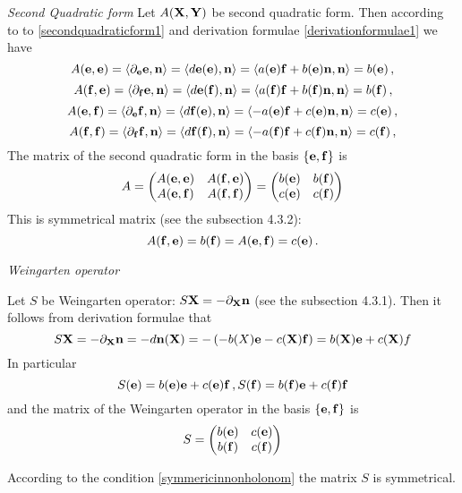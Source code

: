 \documentclass[12pt]{article}
\theoremstyle{theorem}
\numberwithin{equation}{section}
\begin{document}
{\m
{\it Second Quadratic form}
  Let $A({\bf X},{\bf Y})$ be second quadratic form. Then according to
  to \eqref{secondquadraticform1} and derivation formulae \eqref{derivationformulae1} we have
               $$
  A({\bf e},{\bf e})=\langle\partial_{\bf e}{\bf e},{\bf n}\rangle=\langle d{\bf e}({\bf e}),{\bf n}\rangle=\langle a({\bf e}){\bf f}+b({\bf e}){\bf n},{\bf n}\rangle=b({\bf e})\,,
               $$
         $$
   A({\bf f},{\bf e})=\langle\partial_{\bf f}{\bf e},{\bf n}\rangle=\langle d{\bf e}({\bf f}),{\bf n}\rangle=\langle a({\bf f}){\bf f}+b({\bf f}){\bf n},{\bf n}\rangle=b({\bf f})\,,
         $$
         $$
     A({\bf e},{\bf f})=\langle\partial_{\bf e}{\bf f},{\bf n}\rangle=\langle d{\bf f}({\bf e}),{\bf n}\rangle=\langle -a({\bf e}){\bf f}+c({\bf e}){\bf n},{\bf n}\rangle=c({\bf e})\,,
           $$
           $$
           A({\bf f},{\bf f})=\langle\partial_{\bf f}{\bf f},{\bf n}\rangle=\langle d{\bf f}({\bf f}),{\bf n}\rangle=\langle -a({\bf f}){\bf f}+c({\bf f}){\bf n},{\bf n}\rangle=c({\bf f})\,,
           $$
     The matrix of the second quadratic form in the basis $\{{\bf e},{\bf f}\}$ is
     \begin{equation}\label{inducedquadrforminnonholonombasis}
        A=
        \begin{pmatrix}
        A({\bf e},{\bf e})& A({\bf f},{\bf e})\cr
        A({\bf e},{\bf f})& A({\bf f},{\bf f})\cr
        \end{pmatrix}
        =
        \begin{pmatrix}
        b({\bf e})&  b({\bf f})\cr
        c({\bf e})& c({\bf f})\cr
        \end{pmatrix}
     \end{equation}
 This is symmetrical matrix (see the subsection 4.3.2):
            \begin{equation}\label{symmericinnonholonom}
 A({\bf f},{\bf e})=b({\bf f})=A({\bf e},{\bf f})=c({\bf e})\,.
            \end{equation}

\m
{\it Weingarten operator}

Let $S$ be Weingarten operator: $S{\bf X}=-\partial_{\bf X}{\bf n}$ (see the subsection 4.3.1). Then
it follows from derivation formulae that
                  $$
     S{\bf X}=-\partial_{\bf X}{\bf n}=-d{\bf n}({\bf X})=-\left(-b(X){\bf e}-c({\bf X}){\bf f}\right)=b({\bf X}){\bf e}+c({\bf X})f
                  $$
In particular
 \begin{equation*}\label{inducedweingartenoperator}
    S({\bf e})=b({\bf e}){\bf e}+c({\bf e}){\bf f}\,, S({\bf f})=b({\bf f}){\bf e}+c({\bf f}){\bf f}
\end{equation*}
and the matrix of the Weingarten operator in the basis $\{{\bf e},{\bf f}\}$ is
\begin{equation}\label{inducedweingartenoperator}
S=
\begin{pmatrix}
b({\bf e})  &c({\bf e})\cr
b({\bf f})  &c({\bf f})\cr
\end{pmatrix}
\end{equation}

According to the condition \eqref{symmericinnonholonom}  the matrix $S$ is symmetrical.

}
\end{document}
